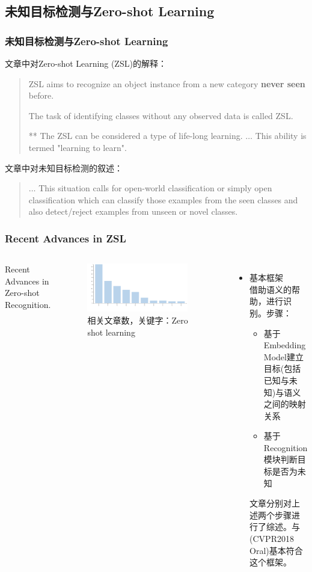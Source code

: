 \documentclass{beamer}
\begin{document}
\subsection{未知目标检测与Zero-shot Learning}

\begin{frame}
\frametitle{未知目标检测与Zero-shot Learning}
文章\cite{Recent2017}中对Zero-shot Learning (ZSL)的解释：
\begin{quote}
{ \footnotesize
ZSL aims to recognize an object instance from a new category \textbf{never seen} before.

The task of identifying classes without any observed data is called ZSL.

** The ZSL can be considered a type of life-long learning. $\ldots$ This ability is termed "learning to learn".
}
\end{quote}
文章\cite{Unseen2018}中对未知目标检测的叙述：
\begin{quote}
$\ldots$ This situation calls for open-world classification or simply open classification which can classify those examples from the seen classes and also detect/reject examples from unseen or novel classes.
\end{quote}

\end{frame}

\begin{frame}
\frametitle{Recent Advances in ZSL}
\begin{columns}
Recent Advances in Zero-shot Recognition.
\begin{figure}
\centering
\includegraphics[width=0.9\textwidth]{Materials/visualization.jpg}
\caption{相关文章数，关键字：Zero shot learning}
\end{figure}

\begin{itemize}
\item 基本框架\\
借助语义的帮助，进行识别。步骤：
\begin{itemize}
\item 基于Embedding Model建立目标(包括已知与未知)与语义之间的映射关系
\item 基于Recognition模块判断目标是否为未知
\end{itemize}
文章分别对上述两个步骤进行了综述。\cite{Discrimintive2018}与\cite{ZSR2018}(CVPR2018 Oral)基本符合这个框架。

\end{itemize}

\end{columns}
\end{frame}
\end{document}
